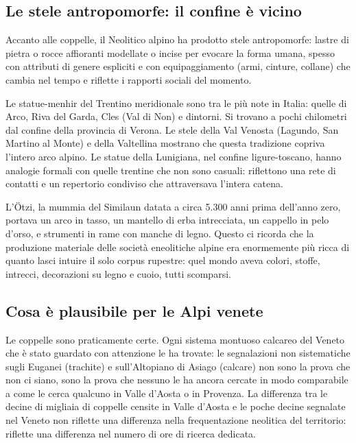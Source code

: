 \subsection{Le stele antropomorfe: il confine è vicino}

Accanto alle coppelle, il Neolitico alpino ha prodotto stele antropomorfe: lastre di pietra o rocce affioranti modellate o incise per evocare la forma umana, spesso con attributi di genere espliciti e con equipaggiamento (armi, cinture, collane) che cambia nel tempo e riflette i rapporti sociali del momento.

Le statue-menhir del Trentino meridionale sono tra le più note in Italia: quelle di Arco, Riva del Garda, Cles (Val di Non) e dintorni. Si trovano a pochi chilometri dal confine della provincia di Verona. Le stele della Val Venosta (Lagundo, San Martino al Monte) e della Valtellina mostrano che questa tradizione copriva l'intero arco alpino. Le statue della Lunigiana, nel confine ligure-toscano, hanno analogie formali con quelle trentine che non sono casuali: riflettono una rete di contatti e un repertorio condiviso che attraversava l'intera catena.

L'\"{O}tzi, la mummia del Similaun datata a circa 5.300 anni prima dell'anno zero, portava un arco in tasso, un mantello di erba intrecciata, un cappello in pelo d'orso, e strumenti in rame con manche di legno. Questo ci ricorda che la produzione materiale delle società eneolitiche alpine era enormemente più ricca di quanto lasci intuire il solo corpus rupestre: quel mondo aveva colori, stoffe, intrecci, decorazioni su legno e cuoio, tutti scomparsi.

\subsection{Cosa è plausibile per le Alpi venete}

Le coppelle sono praticamente certe. Ogni sistema montuoso calcareo del Veneto che è stato guardato con attenzione le ha trovate: le segnalazioni non sistematiche sugli Euganei (trachite) e sull'Altopiano di Asiago (calcare) non sono la prova che non ci siano, sono la prova che nessuno le ha ancora cercate in modo comparabile a come le cerca qualcuno in Valle d'Aosta o in Provenza. La differenza tra le decine di migliaia di coppelle censite in Valle d'Aosta e le poche decine segnalate nel Veneto non riflette una differenza nella frequentazione neolitica del territorio: riflette una differenza nel numero di ore di ricerca dedicata.

